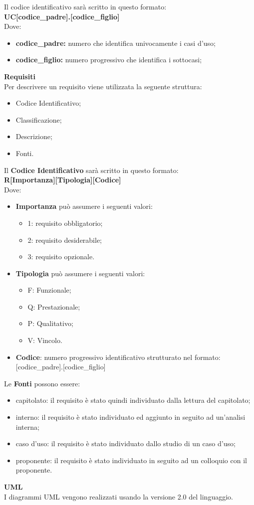 Il codice identificativo sarà scritto in questo formato: \\
\textbf{UC[codice\_padre].[codice\_figlio]} \\
Dove:
\begin{itemize}
	\item \textbf{codice\_padre:} numero che identifica univocamente i casi d'uso;
	\item \textbf{codice\_figlio:} numero progressivo che identifica i sottocasi;
\end{itemize}
\textbf{Requisiti}\\
Per descrivere un requisito viene utilizzata la seguente struttura:
\begin{itemize}
	\item Codice Identificativo;
	\item Classificazione;
	\item Descrizione;
	\item Fonti.
\end{itemize} 
Il \textbf{Codice Identificativo} sarà scritto in questo formato: \\
\textbf{R[Importanza][Tipologia][Codice]} \\
Dove:
\begin{itemize}
	\item \textbf{Importanza} può assumere i seguenti valori:
	\begin{itemize}
		\item 1: requisito obbligatorio;
		\item 2: requisito desiderabile;
		\item 3: requisito opzionale.
	\end{itemize}
	\item \textbf{Tipologia} può assumere i seguenti valori:
	\begin{itemize}
		\item F: Funzionale;
		\item Q: Prestazionale;
		\item P: Qualitativo;
		\item V: Vincolo.
	\end{itemize}
	\item\textbf{Codice}: numero progressivo identificativo strutturato nel formato: [codice\_padre].[codice\_figlio]
\end{itemize}
Le \textbf{Fonti} possono essere:
\begin{itemize}
	\item capitolato\glo: il requisito è stato quindi individuato dalla lettura del capitolato\glo;
	\item interno: il requisito è stato individuato ed aggiunto in seguito ad un'analisi interna;
	\item caso d'uso: il requisito è stato individuato dallo studio di un caso d'uso;
	\item proponente: il requisito è stato individuato in seguito ad un colloquio con il proponente.
\end{itemize}
\textbf{UML} \\
I diagrammi UML vengono realizzati usando la versione 2.0 del linguaggio.
